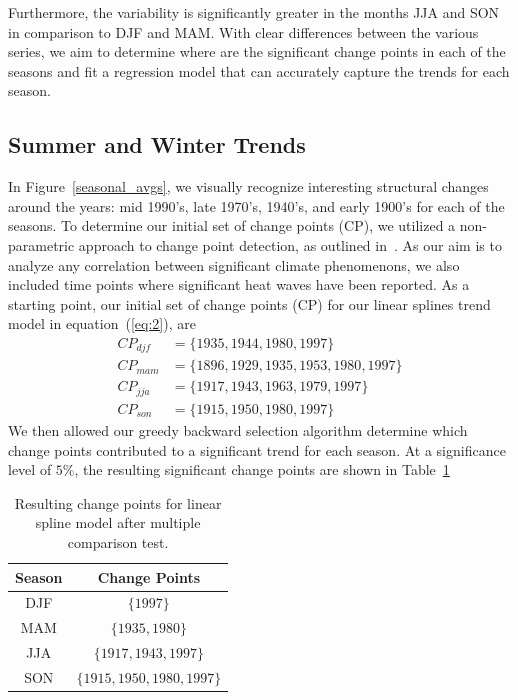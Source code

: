 \documentclass[12pt]{article}
\begin{document}
Furthermore, the variability is significantly greater in the months JJA and SON in comparison to DJF and MAM. With clear differences between the various series, we aim to determine where are the significant change points in each of the seasons and fit a regression model that can accurately capture the trends for each season.


\subsection{Summer and Winter Trends}
In Figure~\ref{seasonal_avgs}, we visually recognize interesting structural changes around the years: mid 1990's, late 1970's, 1940's, and early 1900's for each of the seasons. To determine our initial set of change points (CP), we utilized a non-parametric approach to change point detection, as outlined in~\citep{cps}. As our aim is to analyze any correlation between significant climate phenomenons, we also included time points where significant heat waves have been reported. As a starting point, our initial set of change points (CP) for our linear splines trend model in equation~(\ref{eq:2}), are
\begin{align*}
CP_{djf} &= \{1935, 1944, 1980, 1997\} \\
CP_{mam} &= \{1896, 1929, 1935, 1953, 1980, 1997\} \\
CP_{jja} &= \{1917, 1943, 1963,1979, 1997\} \\
CP_{son} &= \{1915, 1950, 1980, 1997\}
\end{align*}
We then allowed our greedy backward selection algorithm determine which change points contributed to a significant trend for each season. At a significance level of $5\%$, the resulting significant change points are shown in Table~\ref{my_cps}

\begin{table}[!htb]
\centering
\begin{tabular}{|c|c|}
\hline
\textbf{Season}       & \textbf{Change Points} \\ \hline\hline
DJF & $\{1997\}$ \\ \hline
MAM & $\{1935, 1980\}$ \\ \hline
JJA & $\{1917, 1943,1997\}$ \\ \hline
SON & $\{1915, 1950, 1980, 1997\}$ \\ \hline
\end{tabular}
\caption{Resulting change points for linear spline model after multiple comparison test.}\label{my_cps}
\end{table}
\end{document}
